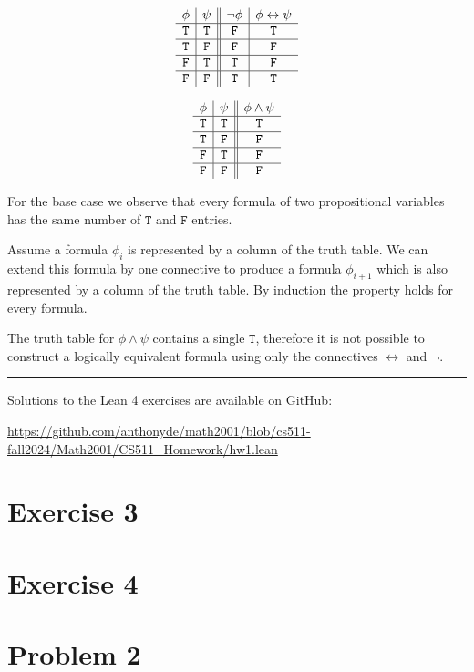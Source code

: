 \documentclass[12pt,leqno]{article}
\newcommand{\T}{\mathtt{T}}
\newcommand{\F}{\mathtt{F}}
\begin{document}
\begin{itemize}
\begin{center}
\begin{minipage}{.4\linewidth}
  \[
  \begin{array}{ c | c || c | c }
    \phi & \psi & \lnot \phi & \phi \leftrightarrow \psi \\
  \hline
    \T & \T & \F & \T \\
  \hline
    \T & \F & \F & \F \\
  \hline
    \F & \T & \T & \F \\
  \hline
    \F & \F & \T & \T \\
  \end{array}
  \]
  \medskip
\end{minipage}
\quad
\begin{minipage}{.4\linewidth}
  \[
  \begin{array}{ c | c || c }
    \phi & \psi & \phi \land \psi \\
  \hline
    \T & \T & \T \\
  \hline
    \T & \F & \F \\
  \hline
    \F & \T & \F \\
  \hline
    \F & \F & \F \\
  \end{array}
  \]
  \medskip
\end{minipage}
\end{center}

For the base case we observe that every formula of two propositional variables
has the same number of $\T$ and $\F$ entries.

Assume a formula $\phi_i$ is represented by a column of the truth table. We
can extend this formula by one connective to produce a formula $\phi_{i+1}$
which is also represented by a column of the truth table. By induction the
property holds for every formula.

The truth table for $\phi \land \psi$ contains a single $\T$, therefore it is
not possible to construct a logically equivalent formula using only the
connectives $\leftrightarrow$ and $\lnot$.

\end{itemize}

\vspace{3\baselineskip}
\hrule

Solutions to the Lean 4 exercises are available on GitHub:

\url{https://github.com/anthonyde/math2001/blob/cs511-fall2024/Math2001/CS511_Homework/hw1.lean}

\section*{Exercise 3}

\section*{Exercise 4}

\section*{Problem 2}
\end{document}
